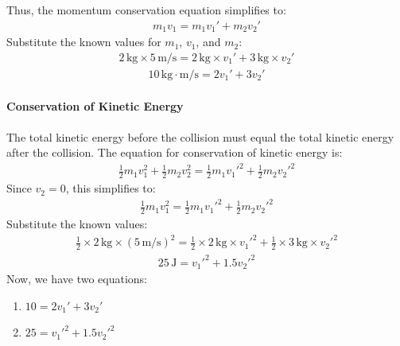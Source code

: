 \documentclass[letterpaper,10pt,english]{jupyterBook}
\begin{document}
\sphinxAtStartPar
Thus, the momentum conservation equation simplifies to:
\begin{equation*}
\begin{split}
m_1 v_1 = m_1 v_1' + m_2 v_2'
\end{split}
\end{equation*}
\sphinxAtStartPar
Substitute the known values for \(m_1\), \(v_1\), and \(m_2\):
\begin{equation*}
\begin{split}
2 \, \text{kg} \times 5 \, \text{m/s} = 2 \, \text{kg} \times v_1' + 3 \, \text{kg} \times v_2'
\end{split}
\end{equation*}\begin{equation*}
\begin{split}
10 \, \text{kg} \cdot \text{m/s} = 2 v_1' + 3 v_2'
\end{split}
\end{equation*}

\paragraph{Conservation of Kinetic Energy}
\label{\detokenize{prerequisites:conservation-of-kinetic-energy}}
\sphinxAtStartPar
The total kinetic energy before the collision must equal the total kinetic energy after the collision. The equation for conservation of kinetic energy is:
\begin{equation*}
\begin{split}
\frac{1}{2} m_1 v_1^2 + \frac{1}{2} m_2 v_2^2 = \frac{1}{2} m_1 v_1'^2 + \frac{1}{2} m_2 v_2'^2
\end{split}
\end{equation*}
\sphinxAtStartPar
Since \(v_2 = 0\), this simplifies to:
\begin{equation*}
\begin{split}
\frac{1}{2} m_1 v_1^2 = \frac{1}{2} m_1 v_1'^2 + \frac{1}{2} m_2 v_2'^2
\end{split}
\end{equation*}
\sphinxAtStartPar
Substitute the known values:
\begin{equation*}
\begin{split}
\frac{1}{2} \times 2 \, \text{kg} \times (5 \, \text{m/s})^2 = \frac{1}{2} \times 2 \, \text{kg} \times v_1'^2 + \frac{1}{2} \times 3 \, \text{kg} \times v_2'^2
\end{split}
\end{equation*}\begin{equation*}
\begin{split}
25 \, \text{J} = v_1'^2 + 1.5 v_2'^2
\end{split}
\end{equation*}
\sphinxAtStartPar
Now, we have two equations:
\begin{enumerate}
%
\item {} 
\sphinxAtStartPar
\( 10 = 2 v_1' + 3 v_2' \)

\item {} 
\sphinxAtStartPar
\( 25 = v_1'^2 + 1.5 v_2'^2 \)

\end{enumerate}
\end{document}
